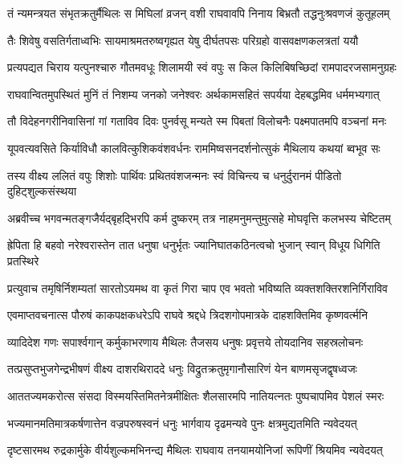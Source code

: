 \twolineshloka
{तं न्यमन्त्रयत संभृतक्रतुर्मैथिलः स मिघिलां व्रजन् वशी}
{राघवावपि निनाय बिभ्रतौ तद्धनुःश्रवणजं कुतूहलम्}%

\twolineshloka
{तैः शिवेषु वसतिर्गताध्वभिः सायमाश्रमतरुष्वगृह्यत}
{येषु दीर्घतपसः परिग्रहो वासवक्षणकलत्रतां ययौ}%

\twolineshloka
{प्रत्यपद्यत चिराय यत्पुनश्चारु गौतमवधूः शिलामयी}
{स्वं वपुः स किल किलिबिषच्छिदां रामपादरजसामनुग्रहः}%

\twolineshloka
{राघवान्वितमुपस्थितं मुनिं तं निशम्य जनको जनेश्वरः}
{अर्थकामसहितं सपर्यया देहबद्धमिव धर्ममभ्यगात्}%

\twolineshloka
{तौ विदेहनगरीनिवासिनां गां गताविव दिवः पुनर्वसू}
{मन्यते स्म पिबतां विलोचनैः पक्ष्मपातमपि वञ्चनां मनः}%

\twolineshloka
{यूपवत्यवसिते किर्याविधौ कालवित्कुशिकवंशवर्धनः}
{राममिष्वसनदर्शनोत्सुकं मैथिलाय कथयां ब्वभूव सः}%

\twolineshloka
{तस्य वीक्ष्य ललितं वपुः शिशोः पार्थिवः प्रथितवंशजन्मनः}
{स्वं विचिन्त्य च धनुर्दुरानमं पीडितो दुहिट्शुल्कसंस्थया}%

\twolineshloka
{अब्रवीच्च भगवन्मतङ्गजैर्यद्बृहद्भिरपि कर्म दुष्करम्}
{तत्र नाहमनुमन्तुमुत्सहे मोघवृत्ति कलभस्य चेष्टितम्}%

\twolineshloka
{ह्रेपिता हि बहवो नरेश्वरास्तेन तात धनुषा धनुर्भृतः}
{ज्यानिघातकठिनत्वचो भुजान् स्वान् विधूय धिगिति प्रतस्थिरे}%

\twolineshloka
{प्रत्युवाच तमृषिर्निशम्यतां सारतोऽयमथ वा कृतं गिरा}
{चाप एव भवतो भविष्यति व्यक्तशक्तिरशनिर्गिराविव}%

\twolineshloka
{एवमाप्तवचनात्स पौरुषं काकपक्षकधरेऽपि राघवे}
{श्रद्दधे त्रिदशगोपमात्रके दाहशक्तिमिव कृष्णवर्त्मनि}%

\twolineshloka
{व्यादिदेश गणः सपार्श्वगान् कर्मुकाभरणाय मैथिलः}
{तैजसय धनुषः प्रवृत्तये तोयदानिव सहस्रलोचनः}%

\twolineshloka
{तत्प्रसुप्तभुजगेन्द्रभीषणं वीक्ष्य दाशरथिराददे धनुः}
{विद्रुतक्रतुमृगानौसारिणं येन बाणमसृजद्वृषध्वजः}%

\twolineshloka
{आततज्यमकरोत्स संसदा विस्मयस्तिमितनेत्रमीक्षितः}
{शैलसारमपि नातियत्नतः पुष्पचापमिव पेशलं स्मरः}%

\twolineshloka
{भज्यमानमतिमात्रकर्षणात्तेन वज्रपरुषस्वनं धनुः}
{भार्गवाय दृढमन्यवे पुनः क्षत्रमुद्यतमिति न्यवेदयत्}%

\twolineshloka
{दृष्टसारमथ रुद्रकार्मुके वीर्यशुल्कमभिनन्द्य मैथिलः}
{राघवाय तनयामयोनिजां रूपिणीं श्रियमिव न्यवेदयत्}%

